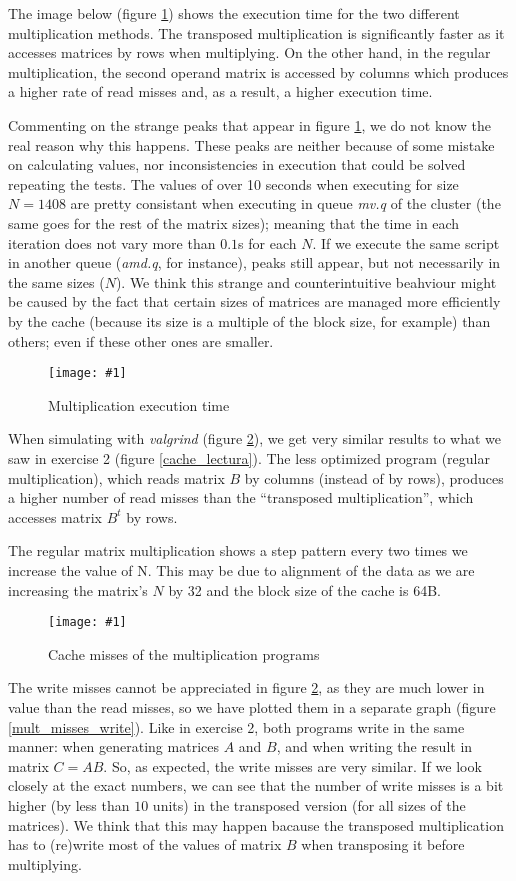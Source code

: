 \documentclass{article}
\newcommand{\myFigure}[4]{%
    \begin{figure}[!ht]
        \texttt{[image: \#1]}
        \centering
        \caption{#2}
        \label{#3}
    \end{figure}
}
\begin{document}
The image below (figure \ref{mult_time}) shows the execution time for the two different multiplication methods. The transposed multiplication is significantly faster as it accesses matrices by rows when multiplying. On the other hand, in the regular multiplication, the second operand matrix is accessed by columns which produces a higher rate of read misses and, as a result, a higher execution time.

Commenting on the strange peaks that appear in figure \ref{mult_time}, we do not know the real reason why this happens. These peaks are neither because of some mistake on calculating values, nor inconsistencies in execution that could be solved repeating the tests. The values of over 10 seconds when executing for size $N=1408$ are pretty consistant when executing in queue \emph{mv.q} of the cluster (the same goes for the rest of the matrix sizes); meaning that the time in each iteration does not vary more than $0.1$s for each $N$. If we execute the same script in another queue (\emph{amd.q}, for instance), peaks still appear, but not necessarily in the same sizes ($N$). We think this strange and counterintuitive beahviour might be caused by the fact that certain sizes of matrices are managed more efficiently by the cache (because its size is a multiple of the block size, for example) than others; even if these other ones are smaller.

\myFigure{../material_P3/out3/mv_att2/mult_time.png}{Multiplication execution time}{mult_time}{0.65}

When simulating with \emph{valgrind} (figure \ref{mult_misses}), we get very similar results to what we saw in exercise 2 (figure \ref{cache_lectura}). The less optimized program (regular multiplication), which reads matrix $B$ by columns (instead of by rows), produces a higher number of read misses than the ``transposed multiplication'', which accesses matrix $B^t$ by rows.

The regular matrix multiplication shows a step pattern every two times we increase the value of N. This may be due to alignment of the data as we are increasing the matrix's $N$ by 32 and the block size of the cache is 64B. 

\myFigure{../material_P3/out3/mv_att2/mult_cache.png}{Cache misses of the multiplication programs}{mult_misses}{0.65}

The write misses cannot be appreciated in figure \ref{mult_misses}, as they are much lower in value than the read misses, so we have plotted them in a separate graph (figure \ref{mult_misses_write}). Like in exercise 2, both programs write in the same manner: when generating matrices $A$ and $B$, and when writing the result in matrix $C=AB$. So, as expected, the write misses are very similar. If we look closely at the exact numbers, we can see that the number of write misses is a bit higher (by less than $10$ units) in the transposed version (for all sizes of the matrices). We think that this may happen bacause the transposed multiplication has to (re)write most of the values of matrix $B$ when transposing it before multiplying.
\end{document}
